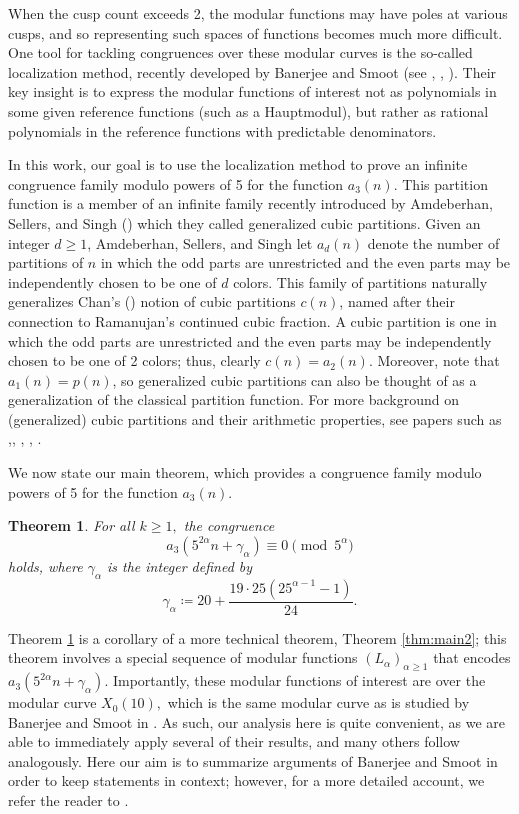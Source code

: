 \documentclass[12pt, reqno]{amsart}
\newtheorem{thm}{Theorem}[section]
\theoremstyle{definition}
\theoremstyle{remark}
\begin{document}
When the cusp count exceeds 2, the modular functions may have poles at various cusps, and so representing such spaces of functions becomes much more difficult. One tool for tackling congruences over these modular curves is the so-called localization method, recently developed by Banerjee and Smoot (see \cite{BS}, \cite{BS2}, \cite{Smoot2elong}). Their key insight is to express the modular functions of interest not as polynomials in some given reference functions (such as a Hauptmodul), but rather as rational polynomials in the reference functions with predictable denominators. 

In this work, our goal is to use the localization method to prove an infinite congruence family modulo powers of 5 for the function $a_3(n).$ This partition function is a member of an infinite family recently introduced by Amdeberhan, Sellers, and Singh (\cite{ASS}) which they called generalized cubic partitions. Given an integer $d \geq 1$, Amdeberhan, Sellers, and Singh let $a_d(n)$ denote the number of partitions of $n$ in which the odd parts are unrestricted and the even parts may be independently chosen to be one of $d$ colors. This family of partitions naturally generalizes Chan's (\cite{Chan}) notion of cubic partitions $c(n)$, named after their connection to Ramanujan's continued cubic fraction. A cubic partition is one in which the odd parts are unrestricted and the even parts may be independently chosen to be one of 2 colors; thus, clearly $c(n) = a_2(n).$ Moreover, note that $a_1(n)=p(n)$, so generalized cubic partitions can also be thought of as a generalization of the classical partition function. For more background on (generalized) cubic partitions and their arithmetic properties, see papers such as \cite{Chan},\cite{CT}, \cite{CD}, \cite{ASS}, \cite{Guad}. 

We now state our main theorem, which provides a congruence family modulo powers of 5 for the function $a_3(n)$.

\begin{thm}\label{thm:main}
For all $k \geq 1,$ the congruence
\[a_3\left(5^{2\alpha}n +\gamma_{\alpha} \right) \equiv 0 \pmod{5^\alpha}\]
holds, where $\gamma_{\alpha}$ is the integer defined by
\begin{equation}\label{eq:gammas}
\gamma_{\alpha} \coloneqq 20 + \frac{19 \cdot 25 (25^{\alpha-1}-1)}{24}.
\end{equation}
\end{thm}

Theorem \ref{thm:main} is a corollary of a more technical theorem, Theorem \ref{thm:main2}; this theorem involves a special sequence of modular functions $(L_\alpha)_{\alpha \geq 1}$ that encodes $a_3(5^{2\alpha}n+\gamma_\alpha)$. Importantly, these modular functions of interest are over the modular curve $X_0(10),$ which is the same modular curve as is studied by Banerjee and Smoot in \cite{BS}. As such, our analysis here is quite convenient, as we are able to immediately apply several of their results, and many others follow analogously. Here our aim is to summarize arguments of Banerjee and Smoot in order to keep statements in context; however, for a more detailed account, we refer the reader to \cite{BS}. 
\end{document}
